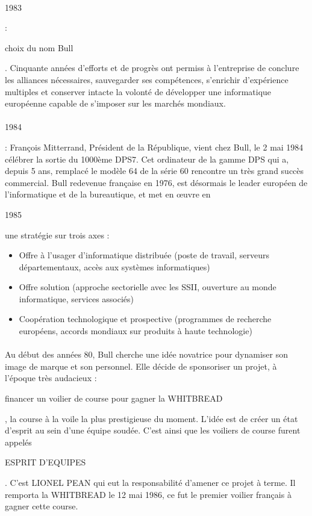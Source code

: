 \documentclass{article}
\begin{document}
		\paragraph{}
		\begin{bf}1983\end{bf}: \begin{bf}choix du nom Bull\end{bf}. Cinquante années d’efforts et de progrès ont permiss à 
		l’entreprise de conclure les alliances nécessaires, sauvegarder ses compétences, s’enrichir d’expérience multiples et 
		conserver intacte la volonté de développer une informatique européenne capable de s’imposer sur les marchés mondiaux.
		\paragraph{}
		\begin{bf}1984\end{bf}: François Mitterrand, Président de la République, vient chez Bull, le 2 mai 1984 célébrer la 
		sortie du 1000ème DPS7. Cet ordinateur de la gamme DPS qui a, depuis 5 ans, remplacé le modèle 64 de la série 60 
		rencontre un très grand succès commercial. Bull redevenue française en 1976, est désormais le leader européen de 
		l’informatique et de la bureautique, et met en œuvre en \begin{bf}1985\end{bf} une stratégie sur trois axes :
		\begin{itemize}
			\item Offre à l’usager d’informatique distribuée (poste de travail, serveurs départementaux, accès aux systèmes 
			informatiques)
			\item Offre solution (approche sectorielle avec les SSII, ouverture au monde informatique, services associés)
			\item Coopération technologique et prospective (programmes de recherche européens, accords mondiaux sur produits 
			à haute technologie)
		\end{itemize}
		\paragraph{}
		Au début des années 80, Bull cherche une idée novatrice pour dynamiser son image de marque et son personnel. 
		Elle décide de sponsoriser un projet, à l'époque très audacieux : \begin{bf}financer un voilier de course pour gagner 
		la WHITBREAD\end{bf}, la course à la voile la plus prestigieuse du moment. L'idée est de créer un état d'esprit au 
		sein d'une équipe soudée. C'est ainsi que les voiliers de course furent appelés \begin{bf}ESPRIT D'EQUIPES\end{bf}. 
		C'est LIONEL PEAN qui eut la responsabilité d'amener ce projet à terme. Il remporta la WHITBREAD le 12 mai 1986, ce 
		fut le premier voilier français à gagner cette course.
\end{document}
